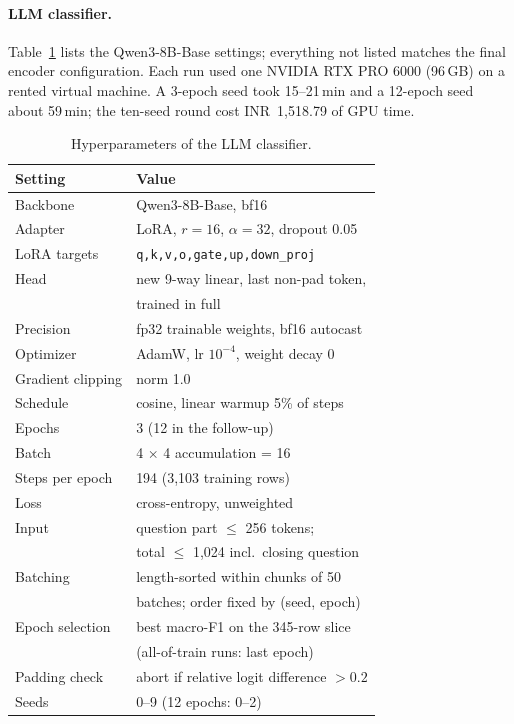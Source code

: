 \paragraph{LLM classifier.}
Table~\ref{tab:app-llm-hparams} lists the Qwen3-8B-Base settings; everything not listed matches the final encoder configuration.
Each run used one NVIDIA RTX PRO 6000 (96\,GB) on a rented virtual machine.
A 3-epoch seed took 15--21\,min and a 12-epoch seed about 59\,min; the ten-seed round cost INR~1,518.79 of GPU time.

\begin{table}[h]
\centering
\small
\begin{tabular}{@{}ll@{}}
\toprule
Setting & Value \\
\midrule
Backbone & Qwen3-8B-Base, bf16 \\
Adapter & LoRA, $r=16$, $\alpha=32$, dropout 0.05 \\
LoRA targets & \texttt{q,k,v,o,gate,up,down\_proj} \\
Head & new 9-way linear, last non-pad token, \\
     & trained in full \\
Precision & fp32 trainable weights, bf16 autocast \\
Optimizer & AdamW, lr $10^{-4}$, weight decay 0 \\
Gradient clipping & norm 1.0 \\
Schedule & cosine, linear warmup 5\% of steps \\
Epochs & 3 (12 in the follow-up) \\
Batch & 4 $\times$ 4 accumulation = 16 \\
Steps per epoch & 194 (3,103 training rows) \\
Loss & cross-entropy, unweighted \\
Input & question part $\le$ 256 tokens; \\
      & total $\le$ 1,024 incl.\ closing question \\
Batching & length-sorted within chunks of 50 \\
         & batches; order fixed by (seed, epoch) \\
Epoch selection & best macro-F1 on the 345-row slice \\
                & (all-of-train runs: last epoch) \\
Padding check & abort if relative logit difference $>0.2$ \\
Seeds & 0--9 (12 epochs: 0--2) \\
\bottomrule
\end{tabular}
\caption{Hyperparameters of the LLM classifier.}
\label{tab:app-llm-hparams}
\end{table}

